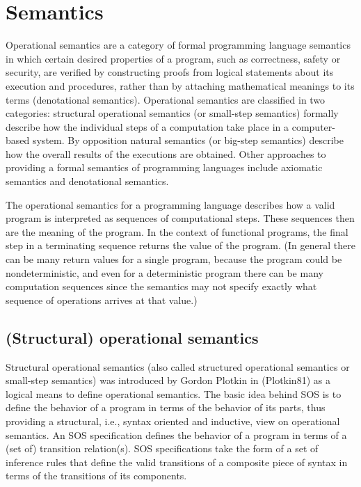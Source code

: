 \documentclass[12pt,b5paper]{book}
\theoremstyle{definition}
\begin{document}
\chapter{Semantics}
Operational semantics are a category of formal programming language semantics in which certain desired properties of a program, such as correctness, safety or security, are verified by constructing proofs from logical statements about its execution and procedures, rather than by attaching mathematical meanings to its terms (denotational semantics). Operational semantics are classified in two categories: structural operational semantics (or small-step semantics) formally describe how the individual steps of a computation take place in a computer-based system. By opposition natural semantics (or big-step semantics) describe how the overall results of the executions are obtained. Other approaches to providing a formal semantics of programming languages include axiomatic semantics and denotational semantics.

The operational semantics for a programming language describes how a valid program is interpreted as sequences of computational steps. These sequences then are the meaning of the program. In the context of functional programs, the final step in a terminating sequence returns the value of the program. (In general there can be many return values for a single program, because the program could be nondeterministic, and even for a deterministic program there can be many computation sequences since the semantics may not specify exactly what sequence of operations arrives at that value.)


\section{(Structural) operational semantics}

Structural operational semantics (also called structured operational semantics or small-step semantics) was introduced by Gordon Plotkin in (Plotkin81) as a logical means to define operational semantics. The basic idea behind SOS is to define the behavior of a program in terms of the behavior of its parts, thus providing a structural, i.e., syntax oriented and inductive, view on operational semantics. An SOS specification defines the behavior of a program in terms of a (set of) transition relation(s). SOS specifications take the form of a set of inference rules that define the valid transitions of a composite piece of syntax in terms of the transitions of its components.
\end{document}
